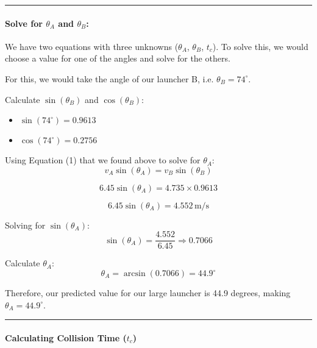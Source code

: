 \documentclass[12pt]{article}
\begin{document}
\vspace{0.5cm} %
\begin{center}
    \rule{0.9\textwidth}{0.5pt} %
\end{center}
\vspace{0.5cm} %

\paragraph{\large \textbf{Solve for \( \theta_A \) and \( \theta_B \):}}

We have two equations with three unknowns (\( \theta_A \), \( \theta_B \), \( t_c \)). 
To solve this, we would choose a value for one of the angles and solve for the others.

For this, we would take the angle of our launcher B, i.e. \( \theta_B = 74^\circ \).

Calculate \( \sin(\theta_B) \) and \( \cos(\theta_B) \):
\begin{itemize}
    \item \( \sin(74^\circ) = 0.9613 \)
    \item \( \cos(74^\circ) = 0.2756 \)
\end{itemize}

Using Equation (1) that we found above to solve for \( \theta_A \):
\[
v_A \sin(\theta_A) = v_B \sin(\theta_B)
\]

\[
6.45 \sin(\theta_A) = 4.735 \times 0.9613
\]

\[
6.45 \sin(\theta_A) = 4.552 \, \text{m/s}
\]

Solving for \( \sin(\theta_A) \):
\[
\sin(\theta_A) = \frac{4.552}{6.45} \Rightarrow 0.7066
\]

Calculate \( \theta_A \):
\[
\theta_A = \arcsin(0.7066) = 44.9^\circ
\]

Therefore, our predicted value for our large launcher is 44.9 degrees, making \( \theta_A = 44.9^\circ \).
\vspace{0.5cm} %
\begin{center}
    \rule{0.9\textwidth}{0.5pt} %
\end{center}
\vspace{0.5cm} %

\paragraph{\large \textbf{Calculating Collision Time (\( t_c \))}}
\end{document}
